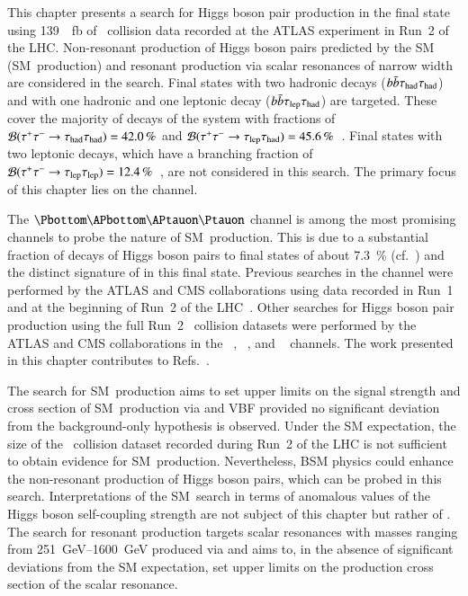 This chapter presents a search for Higgs boson pair production in the \bbtautau
final state using \SI{139}{\per\femto\barn} of \pp~collision data recorded at
the ATLAS experiment in Run~2 of the LHC. Non-resonant production of Higgs boson
pairs predicted by the SM (SM~\HH production) and resonant production via scalar
resonances of narrow width are considered in the search. Final states with two
hadronic \tauleptonC decays ($b\bar{b}\tau_{\text{had}}\tau_{\text{had}}$) and with one hadronic and one
leptonic \tauleptonC decay ($b\bar{b}\tau_{\text{lep}}\tau_{\text{had}}$) are targeted. These cover the
majority of decays of the \tautau system with fractions of
$\mathcal{B}(\tau^{+} \tau^{-} \to \tau_{\text{had}}\tau_{\text{had}}) = \SI{42.0}{\percent}$ and
$\mathcal{B}(\tau^{+} \tau^{-} \to \tau_{\text{lep}}\tau_{\text{had}}) =
\SI{45.6}{\percent}$~\cite{Zyla:2020zbs}. Final states with two leptonic
\tauleptonC decays, which have a branching fraction of
$\mathcal{B}(\tau^{+} \tau^{-} \to \tau_{\text{lep}}\tau_{\text{lep}}) =
\SI{12.4}{\percent}$~\cite{Zyla:2020zbs}, are not considered in this search.
The primary focus of this chapter lies on the \hadhad channel.

The $\bbtautau$ channel is among the most promising channels to probe the nature
of SM~\HH production. This is due to a substantial fraction of decays of Higgs
boson pairs to \bbtautau final states of about \SI{7.3}{\percent}
(cf.~) and the distinct signature of \tauleptons
in this final state. Previous searches in the \bbtautau channel were performed
by the ATLAS and CMS collaborations using data recorded in
Run~1~\cite{HIGG-2013-33,CMS-HIG-15-013} and at the beginning of Run~2 of the
LHC~\cite{HIGG-2016-16-witherratum,CMS-HIG-17-002}.  Other searches for Higgs
boson pair production using the full Run~2 \pp~collision datasets were performed
by the ATLAS and CMS collaborations in the \bbtautau~\cite{CMS-HIG-20-010},
\bbbb~\cite{HDBS-2019-29,CMS-HIG-20-005}, and
\bbyy~\cite{HDBS-2018-34,CMS-HIG-19-018} channels.
The work presented in this chapter contributes to
Refs.~\cite{ATLAS-CONF-2021-030,HDBS-2018-40}.

The search for SM~\HH production aims to set upper limits on the signal strength
and cross section of SM~\HH production via \ggF and VBF provided no significant
deviation from the background-only hypothesis is observed. Under the SM
expectation, the size of the \pp~collision dataset recorded during Run~2 of the
LHC is not sufficient to obtain evidence for SM~\HH production.  Nevertheless,
BSM physics could enhance the non-resonant production of Higgs boson pairs,
which can be probed in this search.
Interpretations of the SM~\HH search in terms of anomalous values of the Higgs
boson self-coupling strength are not subject of this chapter but rather of
. The search for resonant \HH production targets
scalar resonances with masses ranging from \SIrange{251}{1600}{\GeV} produced
via \ggF and aims to, in the absence of significant deviations from the SM
expectation, set upper limits on the production cross section of the scalar
resonance.

